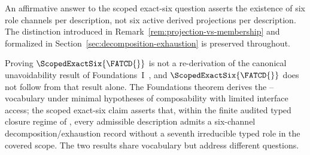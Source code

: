 \begin{remark}\label{rem:channel-vs-activation-reminder}
An affirmative answer to the scoped exact-six question asserts the
existence of six role channels per description, not six active derived
projections per description. The distinction introduced in
Remark~\ref{rem:projection-vs-membership} and formalized in
Section~\ref{sec:decomposition-exhaustion} is preserved throughout.
\end{remark}

\begin{remark}\label{rem:fatcd-foundations-relation}
Proving \(\ScopedExactSix{\FATCD{}}\) is not a re-derivation of the
canonical unavoidability result of Foundations~I~\citep{Tsiokos2026SixBirdsFoundations},
and \(\ScopedExactSix{\FATCD{}}\) does not follow from that result
alone. The Foundations theorem derives the \Pone{}--\Psix{} vocabulary
under minimal hypotheses of composability with limited interface
access; the scoped exact-six claim asserts that, within the finite
audited typed closure regime of \FATCD{}, every admissible description
admits a six-channel decomposition/exhaustion record without a seventh
irreducible typed role in the covered scope. The two results share
vocabulary but address different questions.
\end{remark}
